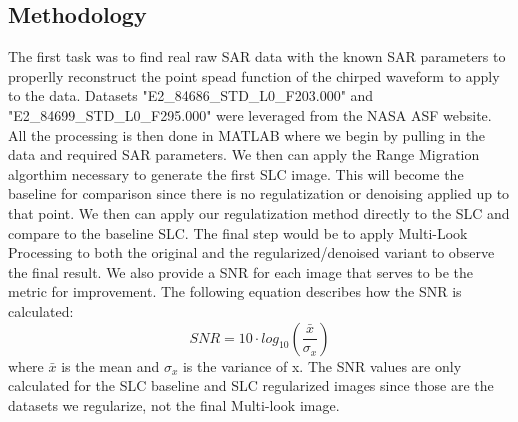 \documentclass[conference]{IEEEtran}
\begin{document}
\subsection{Methodology}
\par The first task was to find real raw SAR data with the known SAR parameters to properlly reconstruct the point spead function of the chirped waveform to apply to the data. Datasets "E2\_84686\_STD\_L0\_F203.000" and "E2\_84699\_STD\_L0\_F295.000" were leveraged from the NASA ASF website\cite{data}. All the processing is then done in MATLAB where we begin by pulling in the data and required SAR parameters. We then can apply the Range Migration algorthim necessary to generate the first SLC image. This will become the baseline for comparison since there is no regulatization or denoising applied up to that point. We then can apply our regulatization method directly to the SLC and compare to the baseline SLC. The final step would be to apply Multi-Look Processing to both the original and the regularized/denoised variant to observe the final result. We also provide a SNR for each image that serves to be the metric for improvement. The following equation describes how the SNR is calculated:
\begin{equation}
    SNR = 10\cdot log_{10}(\frac{\bar{x}}{\sigma_x})
\end{equation}
where $\bar{x}$ is the mean and $\sigma_x$ is the variance of x. The SNR values are only calculated for the SLC baseline and SLC regularized images since those are the datasets we regularize, not the final Multi-look image.
\end{document}
